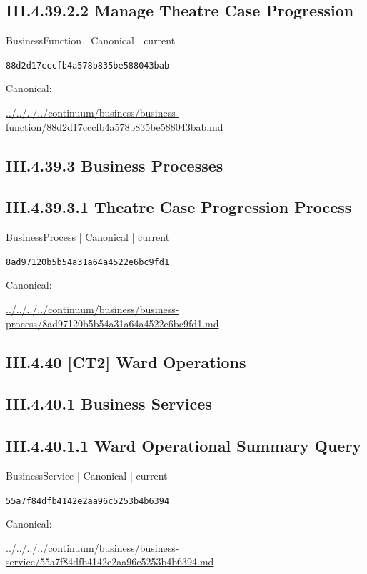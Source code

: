 \documentclass[10pt,a4paper]{article}
\begin{document}
\subsection*{III.4.39.2.2 Manage Theatre Case Progression}
{\small BusinessFunction | Canonical | current}\par
\texttt{88d2d17cccfb4a578b835be588043bab}\par
Canonical: \par
{\footnotesize\url{../../../../continuum/business/business-function/88d2d17cccfb4a578b835be588043bab.md}}\par
\subsection*{III.4.39.3 Business Processes}
\subsection*{III.4.39.3.1 Theatre Case Progression Process}
{\small BusinessProcess | Canonical | current}\par
\texttt{8ad97120b5b54a31a64a4522e6bc9fd1}\par
Canonical: \par
{\footnotesize\url{../../../../continuum/business/business-process/8ad97120b5b54a31a64a4522e6bc9fd1.md}}\par
\subsection*{III.4.40 [CT2] Ward Operations}
\subsection*{III.4.40.1 Business Services}
\subsection*{III.4.40.1.1 Ward Operational Summary Query}
{\small BusinessService | Canonical | current}\par
\texttt{55a7f84dfb4142e2aa96c5253b4b6394}\par
Canonical: \par
{\footnotesize\url{../../../../continuum/business/business-service/55a7f84dfb4142e2aa96c5253b4b6394.md}}\par
\end{document}
